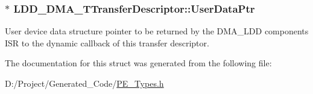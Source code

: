 \subsubsection[{User\+Data\+Ptr}]{$\ast$ L\+D\+D\+\_\+\+D\+M\+A\+\_\+\+T\+Transfer\+Descriptor\+::\+User\+Data\+Ptr}\label{struct_l_d_d___d_m_a___t_transfer_descriptor_a4136d6742944c7b04a94695c78b581b8}
User device data structure pointer to be returned by the D\+M\+A\+\_\+\+L\+D\+D component\textquotesingle{}s I\+S\+R to the dynamic callback of this transfer descriptor. 

The documentation for this struct was generated from the following file\+:\begin{DoxyCompactItemize}
\item 
D\+:/\+Project/\+Generated\+\_\+\+Code/\hyperlink{_p_e___types_8h}{P\+E\+\_\+\+Types.\+h}\end{DoxyCompactItemize}
